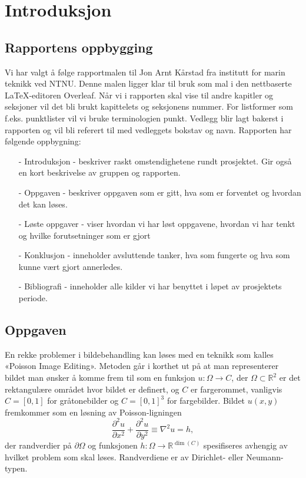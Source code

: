 \section{Introduksjon}


\subsection{Rapportens oppbygging}
Vi har valgt å følge rapportmalen til Jon Arnt Kårstad fra institutt for marin teknikk ved \newline NTNU. Denne malen ligger klar til bruk som mal i den nettbaserte \LaTeX-editoren Overleaf. Når vi i rapporten skal vise til andre kapitler og seksjoner vil det bli brukt kapittelets og seksjonens nummer. For listformer som f.eks. punktlister vil vi bruke terminologien punkt. Vedlegg blir lagt bakerst i rapporten og vil bli referert til med vedleggets bokstav og navn. Rapporten har følgende oppbygning:
\begin{itemize}
  \item[-] Introduksjon - beskriver raskt omstendighetene rundt prosjektet. Gir også en kort beskrivelse av gruppen og rapporten.
  \item[-] Oppgaven - beskriver oppgaven som er gitt, hva som er forventet og hvordan det kan løses.
  \item[-] Løste oppgaver - viser hvordan vi har løst oppgavene, hvordan vi har tenkt og hvilke forutsetninger som er gjort
  \item[-] Konklusjon - inneholder avsluttende tanker, hva som fungerte og hva som kunne vært gjort annerledes.
  \item[-] Bibliografi - inneholder alle kilder vi har benyttet i løpet av prosjektets periode.
\end{itemize}

\subsection{Oppgaven}
En rekke problemer i bildebehandling kan løses med en teknikk som kalles «Poisson Image Editing». Metoden går i korthet ut på at man representerer bildet man ønsker å komme frem til som en funksjon $u : \Omega \to C$, der $\Omega \subset \mathbb{R}^2$ er det rektangulære området hvor bildet er definert, og $C$ er fargerommet, vanligvis $C = [0, 1]$ for gråtonebilder og $C = [0, 1]^3$ for fargebilder. Bildet $u(x, y)$ fremkommer som en løsning av Poisson-ligningen
\begin{equation}
  \frac{\partial^2 u}{\partial x^2} + \frac{\partial^2 u}{\partial y^2} \equiv \nabla^2 u = h,
  \label{eq:poisson}
\end{equation}
der randverdier på $\partial\Omega$ og funksjonen $h : \Omega \to \mathbb{R}^{\dim(C)}$ spesifiseres avhengig av hvilket problem som skal løses. Randverdiene er av Dirichlet- eller Neumann-typen.

